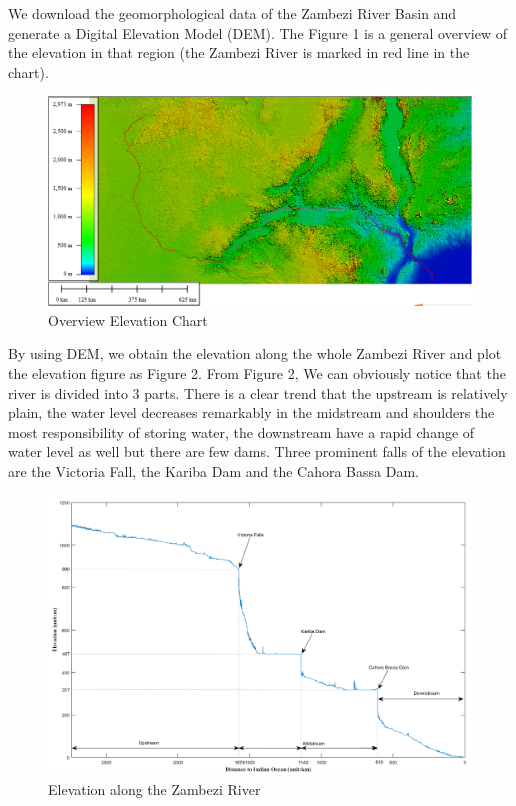 \documentclass{mcmthesis}
\begin{document}
We download the geomorphological data of the Zambezi River Basin and generate a Digital Elevation Model (DEM). The Figure 1 is a general overview of the elevation in that region (the Zambezi River is marked in red line in the chart).

\begin{figure}[h]
\small
\centering
\includegraphics[width=14cm]{./figures/Sensing_Figure.png}
\caption{Overview Elevation Chart} \label{fig:Fig1}
\end{figure}

By using DEM, we obtain the elevation along the whole Zambezi River and plot the elevation figure as Figure 2. From Figure 2, We can obviously notice that the river is divided into 3 parts. There is a clear trend that the upstream is relatively plain, the water level decreases remarkably in the midstream and shoulders the most responsibility of storing water, the downstream have a rapid change of water level as well but there are few dams. Three prominent falls of the elevation are the Victoria Fall, the Kariba Dam and the Cahora Bassa Dam.

\begin{figure}[h]
\small
\centering
\includegraphics[width=14cm]{./figures/dis_alti_v3.png}
\caption{Elevation along the Zambezi River} \label{fig:Fig2}
\end{figure}
\end{document}
